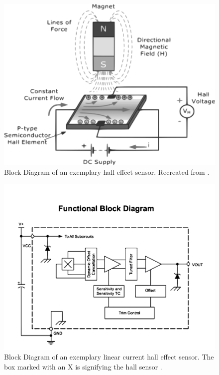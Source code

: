 \begin{figure}[th]
	\centering
	\includegraphics[width=\textwidth]{images/hall_sensor2.png}
	\caption{Block Diagram of an exemplary hall effect sensor. Recreated from \cite{hall_sensor}.} 
	\label{fig:hall_sensor_block}
\end{figure}

\begin{figure}[th]
	\centering
	\includegraphics[width=\textwidth]{images/lcs_block_diagram.png}
	\caption{Block Diagram of an exemplary linear current hall effect sensor. The box marked with an X is signifying the hall sensor \cite{hall_effect_element14}.} 
	\label{fig:lcs_block}
\end{figure}

